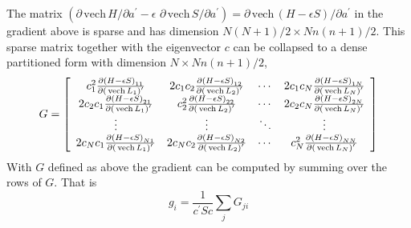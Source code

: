 \documentclass[12pt,thmsa]{article}
\begin{document}
The matrix $\left( \partial \,\mathrm{vech}\,H/\partial a^{\prime }-\epsilon
\,\,\partial \,\mathrm{vech}\,S/\partial a^{\prime }\right) =\partial \,%
\mathrm{vech}\,\left( H-\epsilon S\right) /\partial a^{\prime }$ in the
gradient above is sparse and has dimension $N\left( N+1\right) /2\times
Nn\left( n+1\right) /2$. This sparse matrix together with the eigenvector $c$
can be collapsed to a dense partitioned form with dimension $N\times
Nn\left( n+1\right) /2$, 
\begin{equation}
G=\left[ 
\begin{array}{cccc}
c_1^2\frac{\partial \left( H-\epsilon S\right) _{11}}{\partial \left( \,%
\mathrm{vech}\,L_1\right) ^{\prime }} & 2c_1c_2\frac{\partial \left(
H-\epsilon S\right) _{12}}{\partial \left( \,\mathrm{vech}\,L_2\right)
^{\prime }} & \cdots & 2c_1c_N\frac{\partial \left( H-\epsilon S\right) _{1N}%
}{\partial \left( \,\mathrm{vech}\,L_N\right) ^{\prime }} \\ 
2c_2c_1\frac{\partial \left( H-\epsilon S\right) _{21}}{\partial \left( \,%
\mathrm{vech}\,L_1\right) ^{\prime }} & c_2^2\frac{\partial \left(
H-\epsilon S\right) _{22}}{\partial \left( \,\mathrm{vech}\,L_2\right)
^{\prime }} & \cdots & 2c_2c_N\frac{\partial \left( H-\epsilon S\right) _{2N}%
}{\partial \left( \,\mathrm{vech}\,L_N\right) ^{\prime }} \\ 
\vdots & \vdots & \ddots & \vdots \\ 
2c_Nc_1\frac{\partial \left( H-\epsilon S\right) _{N1}}{\partial \left( \,%
\mathrm{vech}\,L_1\right) ^{\prime }} & 2c_Nc_2\frac{\partial \left(
H-\epsilon S\right) _{N2}}{\partial \left( \,\mathrm{vech}\,L_2\right)
^{\prime }} & \cdots & c_N^2\frac{\partial \left( H-\epsilon S\right) _{NN}}{%
\partial \left( \,\mathrm{vech}\,L_N\right) ^{\prime }}
\end{array}
\right]
\end{equation}
With $G$ defined as above the gradient can be computed by summing over the
rows of $G$. That is 
\[
g_i=\frac 1{c^{\prime }Sc}\sum_jG_{ji} 
\]
\end{document}
